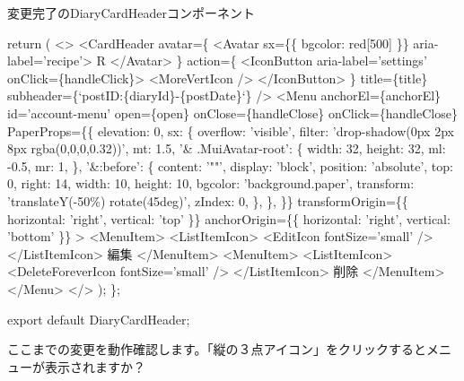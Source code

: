 \begin{starterprogram}[]{変更完了のDiaryCardHeaderコンポーネント}
{    return (
      \textless{}\textgreater{}
        \textless{}CardHeader
          avatar=\{
            \textless{}Avatar sx=\{\{ bgcolor: red[500] \}\} aria{-}label='recipe'\textgreater{}
              R
            \textless{}/Avatar\textgreater{}
          \}
          action=\{
            \textless{}IconButton aria{-}label='settings' onClick=\{handleClick\}\textgreater{}
              \textless{}MoreVertIcon /\textgreater{}
            \textless{}/IconButton\textgreater{}
          \}
          title=\{title\}
          subheader=\{`postID:\textdollar{}\{diaryId\}{-}\textdollar{}\{postDate\}`\}
        /\textgreater{}
        \textless{}Menu
          anchorEl=\{anchorEl\}
          id='account{-}menu'
          open=\{open\}
          onClose=\{handleClose\}
          onClick=\{handleClose\}
          PaperProps=\{\{
            elevation: 0,
            sx: \{
              overflow: 'visible',
              filter: 'drop{-}shadow(0px 2px 8px rgba(0,0,0,0.32))',
              mt: 1.5,
              '\& .MuiAvatar{-}root': \{
                width: 32,
                height: 32,
                ml: {-}0.5,
                mr: 1,
              \},
              '\&:before': \{
                content: '""',
                display: 'block',
                position: 'absolute',
                top: 0,
                right: 14,
                width: 10,
                height: 10,
                bgcolor: 'background.paper',
                transform: 'translateY({-}50\%) rotate(45deg)',
                zIndex: 0,
              \},
            \},
          \}\}
          transformOrigin=\{\{ horizontal: 'right', vertical: 'top' \}\}
          anchorOrigin=\{\{ horizontal: 'right', vertical: 'bottom' \}\}
        \textgreater{}
          \textless{}MenuItem\textgreater{}
            \textless{}ListItemIcon\textgreater{}
              \textless{}EditIcon fontSize='small' /\textgreater{}
            \textless{}/ListItemIcon\textgreater{}
            編集
          \textless{}/MenuItem\textgreater{}
          \textless{}MenuItem\textgreater{}
            \textless{}ListItemIcon\textgreater{}
              \textless{}DeleteForeverIcon fontSize='small' /\textgreater{}
            \textless{}/ListItemIcon\textgreater{}
            削除
          \textless{}/MenuItem\textgreater{}
        \textless{}/Menu\textgreater{}
      \textless{}/\textgreater{}
    );
  \};

  export default DiaryCardHeader;}\end{starterprogram}

ここまでの変更を動作確認します。「縦の３点アイコン」をクリックするとメニューが表示されますか？

